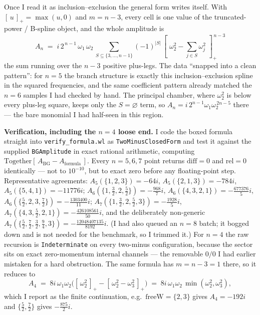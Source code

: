\documentclass{article}
\newcommand{\pp}[1]{\left[\,#1\,\right]_{+}}
\begin{document}
Once I read it as inclusion--exclusion the general form writes itself. With
$\pp{u}=\max(u,0)$ and $m=n-3$, every cell is one value of the truncated-power /
B-spline object, and the whole amplitude is
\[
\boxed{\;
A_n \;=\; i\,2^{\,n-1}\,\omega_1\,\omega_2\,
\sum_{S\subseteq\{3,\dots,n-1\}}(-1)^{|S|}\,
\pp{\,\omega_2^{2}-\sum_{j\in S}\omega_j^{2}\,}^{\,n-3}\;}
\]
the sum running over the $n-3$ positive plus-legs. The data ``snapped into a
clean pattern'': for $n=5$ the branch structure is exactly this
inclusion--exclusion spline in the squared frequencies, and the same coefficient
pattern already matched the $n=6$ samples I had checked by hand. The
principal chamber, where $\omega_2^2$ is below every plus-leg square, keeps
only the $S=\varnothing$ term, so $A_n=i\,2^{n-1}\omega_1\omega_2^{\,2n-5}$
there --- the bare monomial I had half-seen in this region.

\medskip
\noindent\textbf{Verification, including the $n=4$ loose end.}\quad
I code the boxed formula straight into \texttt{verify\_formula.wl} as
\texttt{TwoMinusClosedForm} and test it against the supplied \texttt{BGAmplitude}
in exact rational arithmetic, computing $\mathrm{Together}[\,A_{\mathrm{BG}}-
A_{\mathrm{formula}}\,]$. Every $n=5,6,7$ point returns
$\mathrm{diff}=0$ and $\mathrm{rel}=0$ identically --- not to $10^{-10}$, but to
exact zero before any floating-point step. Representative agreements:
$A_5(\{1,2,3\})=-64i$, $A_5(\{2,1,3\})=-784i$, $A_5(\{5,4,1\})=-11776i$;
$A_6(\{1,\tfrac32,2,\tfrac52\})=-\tfrac{968}{7}i$,
$A_6(\{4,3,2,1\})=-\tfrac{677376}{5}i$,
$A_6(\{\tfrac52,2,3,\tfrac72\})=-\tfrac{1303400}{11}i$;
$A_7(\{1,\tfrac32,2,\tfrac52,3\})=-\tfrac{1928}{5}i$,
$A_7(\{4,3,\tfrac52,2,1\})=-\tfrac{426108561}{50}i$, and the deliberately
non-generic $A_7(\{\tfrac52,\tfrac72,\tfrac32,\tfrac94,3\})
=-\tfrac{12048407135}{8192}i$. (I had also queued an $n=8$ batch; it bogged down
and is not needed for the benchmark, so I trimmed it.) For $n=4$ the raw
recursion is \texttt{Indeterminate} on every two-minus configuration, because the
sector sits on exact zero-momentum internal channels --- the removable $0/0$ I
had earlier mistaken for a hard obstruction. The same formula has $m=n-3=1$
there, so it reduces to
\[
A_4 \;=\; 8 i\,\omega_1\omega_2\big(\pp{\omega_2^2}-\pp{\omega_2^2-\omega_3^2}\big)
\;=\; 8 i\,\omega_1\omega_2\,\min(\omega_2^2,\omega_3^2),
\]
which I report as the finite continuation, e.g.\ $\mathrm{freeW}=\{2,3\}$ gives
$A_4=-192i$ and $\{\tfrac52,\tfrac72\}$ gives $-\tfrac{875}{2}i$.
\end{document}
